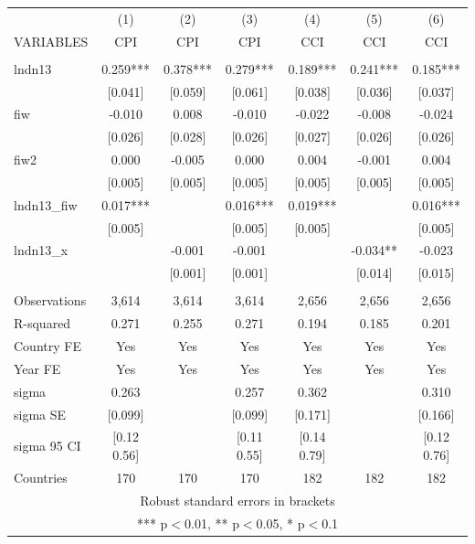 \begin{tabular}{lcccccc} \hline
 & (1) & (2) & (3) & (4) & (5) & (6) \\
VARIABLES & CPI & CPI & CPI & CCI & CCI & CCI \\ \hline
 &  &  &  &  &  &  \\
lndn13 & 0.259*** & 0.378*** & 0.279*** & 0.189*** & 0.241*** & 0.185*** \\
 & [0.041] & [0.059] & [0.061] & [0.038] & [0.036] & [0.037] \\
fiw & -0.010 & 0.008 & -0.010 & -0.022 & -0.008 & -0.024 \\
 & [0.026] & [0.028] & [0.026] & [0.027] & [0.026] & [0.026] \\
fiw2 & 0.000 & -0.005 & 0.000 & 0.004 & -0.001 & 0.004 \\
 & [0.005] & [0.005] & [0.005] & [0.005] & [0.005] & [0.005] \\
lndn13\_fiw & 0.017*** &  & 0.016*** & 0.019*** &  & 0.016*** \\
 & [0.005] &  & [0.005] & [0.005] &  & [0.005] \\
lndn13\_x &  & -0.001 & -0.001 &  & -0.034** & -0.023 \\
 &  & [0.001] & [0.001] &  & [0.014] & [0.015] \\
 &  &  &  &  &  &  \\
Observations & 3,614 & 3,614 & 3,614 & 2,656 & 2,656 & 2,656 \\
R-squared & 0.271 & 0.255 & 0.271 & 0.194 & 0.185 & 0.201 \\
Country FE & Yes & Yes & Yes & Yes & Yes & Yes \\
Year FE & Yes & Yes & Yes & Yes & Yes & Yes \\
sigma & 0.263 &  & 0.257 & 0.362 &  & 0.310 \\
sigma SE & [0.099] &  & [0.099] & [0.171] &  & [0.166] \\
sigma 95 CI & [0.12 0.56] &  & [0.11 0.55] & [0.14 0.79] &  & [0.12 0.76] \\
 Countries & 170 & 170 & 170 & 182 & 182 & 182 \\ \hline
\multicolumn{7}{c}{ Robust standard errors in brackets} \\
\multicolumn{7}{c}{ *** p$<$0.01, ** p$<$0.05, * p$<$0.1} \\
\end{tabular}

